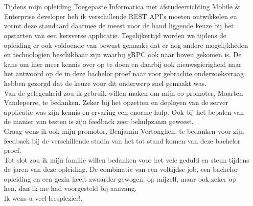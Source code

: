 
\chapter*{}%
\label{ch:voorwoord}

Tijdens mijn opleiding Toegepaste Informatica met afstudeerrichting Mobile \& Enterprise developer heb ik verschillende REST API's moeten ontwikkelen
en vormt deze standaard daarmee de meest voor de hand liggende keuze bij het opstarten van een kersverse applicatie. Tegelijkertijd worden we tijdens
de opleiding er ook voldoende van bewust gemaakt dat er nog andere mogelijkheden en technologi\"en beschikbaar zijn waarbij gRPC ook naar boven gekomen is.
De kans om hier meer kennis over op te doen en daarbij ook nieuwsgierigheid naar het antwoord op de in deze bachelor proef naar voor gebrachte onderzoeksvraag
hebben gezorgd dat de keuze voor dit onderwerp snel gemaakt was.\\

Van de gelegenheid zou ik gebruik willen maken om mijn co-promoter, Maarten Vandeperre, te bedanken. Zeker bij het opzetten en deployen van de server applicatie was
zijn kennis en ervaring een enorme hulp. Ook bij het bepalen van de manier van testen is zijn feedback zeer behulpzaam geweest.\\

Graag wens ik ook mijn promotor, Benjamin Vertonghen, te bedanken voor zijn feedback bij de verschillende stadia van het tot stand komen van deze bachelor proef.\\

Tot slot zou ik mijn familie willen bedanken voor het vele geduld en steun tijdens de jaren van deze opleiding. De combinatie van een voltijdse job, een bachelor opleiding en
een gezin heeft zwaarder gewogen, op mijzelf, maar ook zeker op hen, dan ik me had voorgesteld bij aanvang.\\

Ik wens u veel leesplezier!.